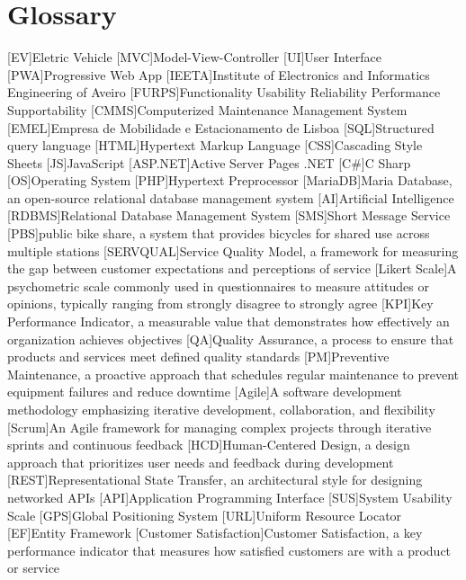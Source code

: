\chapter{Glossary}

\footnotesize
\SingleSpacing

\begin{multicols}{2}
\begin{acronym}[AAAAAA]

	[EV]{Eletric Vehicle}
	[MVC]{Model-View-Controller}
	[UI]{User Interface}
	[PWA]{Progressive Web App}
	[IEETA]{Institute of Electronics and Informatics Engineering of Aveiro}
	[FURPS]{Functionality Usability Reliability Performance Supportability}
	[CMMS]{Computerized Maintenance Management System}
	[EMEL]{Empresa de Mobilidade e Estacionamento de Lisboa}
	[SQL]{Structured query language}
	[HTML]{Hypertext Markup Language}
	[CSS]{Cascading Style Sheets}
	[JS]{JavaScript}
	[ASP.NET]{Active Server Pages .NET}
	[C\#]{C Sharp}
	[OS]{Operating System}
	[PHP]{Hypertext Preprocessor}
	[MariaDB]{Maria Database, an open-source relational database management system}
	[AI]{Artificial Intelligence}
	[RDBMS]{Relational Database Management System}
	[SMS]{Short Message Service}
	[PBS]{public bike share, a system that provides bicycles for shared use across multiple stations}
	[SERVQUAL]{Service Quality Model, a framework for measuring the gap between customer expectations and perceptions of service}
	[Likert Scale]{A psychometric scale commonly used in questionnaires to measure attitudes or opinions, typically ranging from strongly disagree to strongly agree}
	[KPI]{Key Performance Indicator, a measurable value that demonstrates how effectively an organization achieves objectives}
	[QA]{Quality Assurance, a process to ensure that products and services meet defined quality standards}
	[PM]{Preventive Maintenance, a proactive approach that schedules regular maintenance to prevent equipment failures and reduce downtime}
	[Agile]{A software development methodology emphasizing iterative development, collaboration, and flexibility}
	[Scrum]{An Agile framework for managing complex projects through iterative sprints and continuous feedback}
	[HCD]{Human-Centered Design, a design approach that prioritizes user needs and feedback during development}
	[REST]{Representational State Transfer, an architectural style for designing networked APIs}
	[API]{Application Programming Interface}
	[SUS]{System Usability Scale}
	[GPS]{Global Positioning System}
	[URL]{Uniform Resource Locator}
	[EF]{Entity Framework}
	[Customer Satisfaction]{Customer Satisfaction, a key performance indicator that measures how satisfied customers are with a product or service}


\end{acronym}
\end{multicols}
